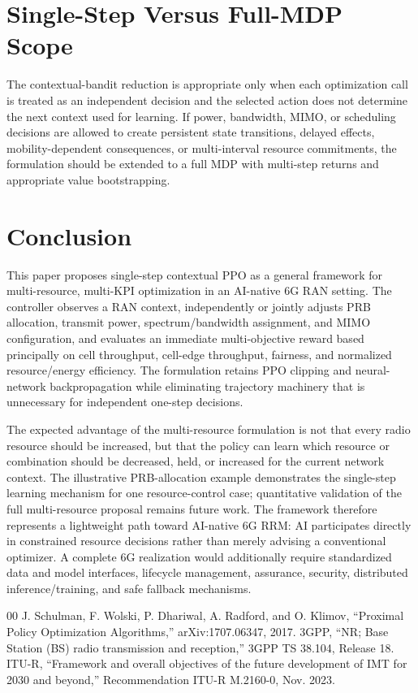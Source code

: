 \documentclass[conference]{IEEEtran}
\begin{document}
\section{Single-Step Versus Full-MDP Scope}
The contextual-bandit reduction is appropriate only when each optimization call is treated as an independent decision and the selected action does not determine the next context used for learning. If power, bandwidth, MIMO, or scheduling decisions are allowed to create persistent state transitions, delayed effects, mobility-dependent consequences, or multi-interval resource commitments, the formulation should be extended to a full MDP with multi-step returns and appropriate value bootstrapping.

\section{Conclusion}
This paper proposes single-step contextual PPO as a general framework for multi-resource, multi-KPI optimization in an AI-native 6G RAN setting. The controller observes a RAN context, independently or jointly adjusts PRB allocation, transmit power, spectrum/bandwidth assignment, and MIMO configuration, and evaluates an immediate multi-objective reward based principally on cell throughput, cell-edge throughput, fairness, and normalized resource/energy efficiency. The formulation retains PPO clipping and neural-network backpropagation while eliminating trajectory machinery that is unnecessary for independent one-step decisions.

The expected advantage of the multi-resource formulation is not that every radio resource should be increased, but that the policy can learn which resource or combination should be decreased, held, or increased for the current network context. The illustrative PRB-allocation example demonstrates the single-step learning mechanism for one resource-control case; quantitative validation of the full multi-resource proposal remains future work. The framework therefore represents a lightweight path toward AI-native 6G RRM: AI participates directly in constrained resource decisions rather than merely advising a conventional optimizer. A complete 6G realization would additionally require standardized data and model interfaces, lifecycle management, assurance, security, distributed inference/training, and safe fallback mechanisms.

\begin{thebibliography}{00}
 J. Schulman, F. Wolski, P. Dhariwal, A. Radford, and O. Klimov, ``Proximal Policy Optimization Algorithms,'' arXiv:1707.06347, 2017.
 3GPP, ``NR; Base Station (BS) radio transmission and reception,'' 3GPP TS 38.104, Release 18.
 ITU-R, ``Framework and overall objectives of the future development of IMT for 2030 and beyond,'' Recommendation ITU-R M.2160-0, Nov. 2023.
\end{thebibliography}
\end{document}
